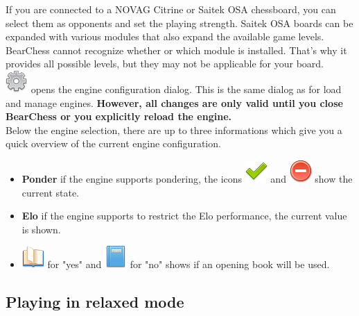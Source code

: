 \documentclass[11pt,a4paper]{article}
\begin{document}
If you are connected to a NOVAG Citrine or Saitek OSA chessboard, you can select them as opponents and set the playing strength. Saitek OSA boards can be expanded with various modules that also expand the available game levels. BearChess cannot recognize whether or which module is installed. That's why it provides all possible levels, but they may not be applicable for your board.\\

\includegraphics[scale=0.4]{cog.png} opens the engine configuration dialog. This is the same dialog as for load and manage engines. \textbf{However, all changes are only valid until you close BearChess or you explicitly  reload the engine.}\\
Below the engine selection, there are up to three informations which give you a quick overview of the current engine configuration.

\begin{itemize}
	\item \textbf{Ponder} if the engine supports pondering, the icons \includegraphics[scale=0.4]{tick.png} and \includegraphics[scale=0.4]{delete.png} show the current state.
	\item \textbf{Elo} if the engine supports to restrict the Elo performance, the current value is shown.
	\item  \includegraphics[scale=0.4]{book_open.png} for "yes" and \includegraphics[scale=0.4]{book.png} for "no" shows if an opening book will be used.
\end{itemize}

\subsection{Playing in relaxed mode}
\end{document}
